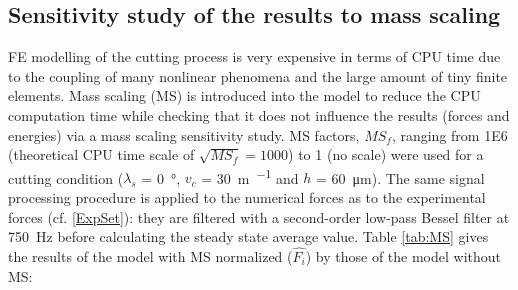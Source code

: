 \documentclass[preprint,12pt,times]{elsarticle}
\newcommand{\dnsp}[2]{{#1}_{\!\!#2}}  %
\begin{document}
\subsection{Sensitivity study of the results to mass scaling}

FE modelling of the cutting process is very expensive in terms of CPU time due to the coupling of many nonlinear phenomena and the large amount of tiny finite elements. Mass scaling (MS) is introduced into the model to reduce the CPU computation time while checking that it does not influence the results (forces and energies) via a mass scaling sensitivity study. MS factors, $\dnsp{MS}{f}$, ranging from \num{1E6} (theoretical CPU time scale of $\sqrt{\dnsp{MS}{f}} = \num{1000}$) to 1 (no scale) were used for a cutting condition ($\lambda_s$ = \qty{0}{\degree}, $v_c$ = \qty{30}{\m\per\min} and $h$ = \qty{60}{\um}). The same signal processing procedure is applied to the numerical forces as to the experimental forces (cf. \ref{ExpSet}): they are filtered with a second-order low-pass Bessel filter at \qty{750}{\Hz} before calculating the steady state average value. Table \ref{tab:MS} gives the results of the model with MS normalized ($\hat{F_i}$) by those of the model without MS:
\end{document}
